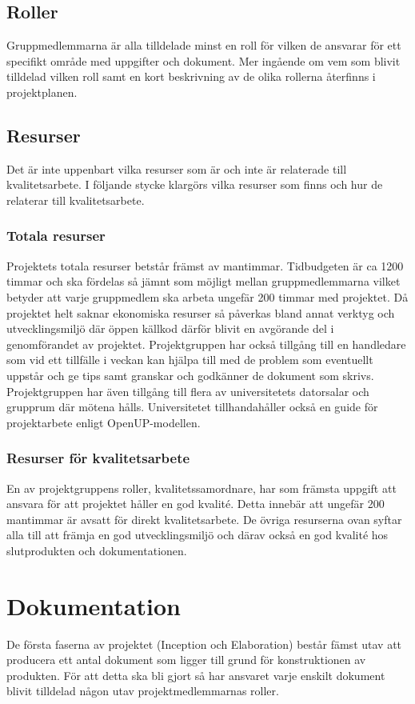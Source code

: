 \subsection{Roller}
Gruppmedlemmarna är alla tilldelade minst en roll för vilken de ansvarar för ett specifikt område med uppgifter och dokument. Mer ingående om vem som blivit tilldelad vilken roll samt en kort beskrivning av de olika rollerna återfinns i projektplanen.

\subsection{Resurser}
Det är inte uppenbart vilka resurser som är och inte är relaterade till kvalitetsarbete. I följande stycke klargörs vilka resurser som finns och hur de relaterar till kvalitetsarbete.

\subsubsection{Totala resurser}
Projektets totala resurser betstår främst av mantimmar. Tidbudgeten är ca 1200 timmar och ska fördelas så jämnt som möjligt mellan gruppmedlemmarna vilket betyder att varje gruppmedlem ska arbeta ungefär 200 timmar med projektet. Då projektet helt saknar ekonomiska resurser så påverkas bland annat verktyg och utvecklingsmiljö där öppen källkod därför blivit en avgörande del i genomförandet av projektet. Projektgruppen har också tillgång till en handledare som vid ett tillfälle i veckan kan hjälpa till med de problem som eventuellt uppstår och ge tips samt granskar och godkänner de dokument som skrivs. Projektgruppen har även tillgång till flera av universitetets datorsalar och grupprum där mötena hålls. Universitetet tillhandahåller också en guide för projektarbete enligt OpenUP-modellen.

\subsubsection{Resurser för kvalitetsarbete}
En av projektgruppens roller, kvalitetssamordnare,  har som främsta uppgift att ansvara för att projektet håller en god kvalité. Detta innebär att ungefär 200 mantimmar är avsatt för direkt kvalitetsarbete. De övriga resurserna ovan syftar alla till att främja en god utvecklingsmiljö och därav också en god kvalité hos slutprodukten och dokumentationen.

\section{Dokumentation}
De första faserna av projektet (Inception och Elaboration) består fämst utav att producera ett antal dokument som ligger till grund för konstruktionen av produkten. För att detta ska bli gjort så har ansvaret varje enskilt dokument blivit tilldelad någon utav projektmedlemmarnas roller.

